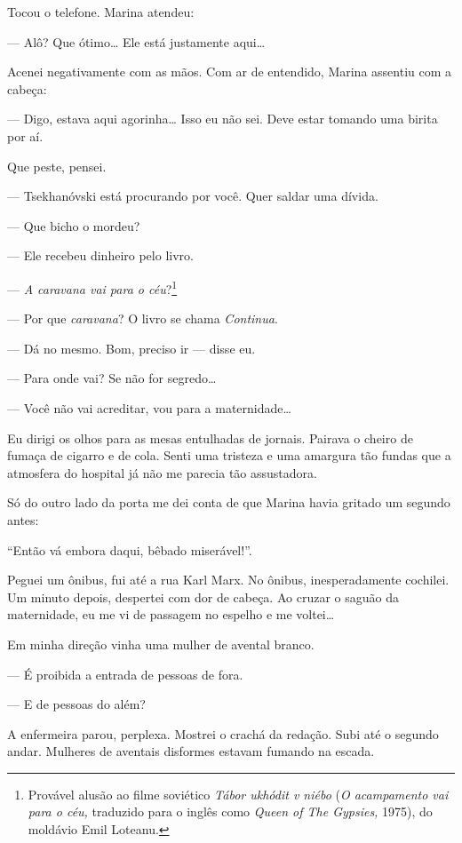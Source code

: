 Tocou o telefone. Marina atendeu:

--- Alô? Que ótimo\ldots{} Ele está justamente aqui\ldots{}

Acenei negativamente com as mãos. Com ar de entendido, Marina assentiu
com a cabeça:

--- Digo, estava aqui agorinha\ldots{} Isso eu não sei. Deve estar tomando
uma birita por aí.

Que peste, pensei.

--- Tsekhanóvski está procurando por você. Quer saldar uma dívida.

--- Que bicho o mordeu?

--- Ele recebeu dinheiro pelo livro.

--- \emph{A caravana vai para o céu}?\footnote{Provável alusão ao filme
  soviético \emph{Tábor ukhódit v niébo} (\emph{O acampamento vai para o
  céu,} traduzido para o inglês como \emph{Queen of The Gypsies,} 1975),
  do moldávio Emil Loteanu.}

--- Por que \emph{caravana}? O livro se chama \emph{Continua}.

--- Dá no mesmo. Bom, preciso ir --- disse eu.

--- Para onde vai? Se não for segredo\ldots{}

--- Você não vai acreditar, vou para a maternidade\ldots{}

Eu dirigi os olhos para as mesas entulhadas de jornais. Pairava o cheiro
de fumaça de cigarro e de cola. Senti uma tristeza e uma amargura tão
fundas que a atmosfera do hospital já não me parecia tão assustadora.

Só do outro lado da porta me dei conta de que Marina havia gritado um
segundo antes:

``Então vá embora daqui, bêbado miserável!''.

\bigskip

Peguei um ônibus, fui até a rua Karl Marx. No ônibus, inesperadamente
cochilei. Um minuto depois, despertei com dor de cabeça. Ao cruzar o
saguão da maternidade, eu me vi de passagem no espelho e me
voltei\ldots{}

Em minha direção vinha uma mulher de avental branco.

--- É proibida a entrada de pessoas de fora.

--- E de pessoas do além?

A enfermeira parou, perplexa. Mostrei o crachá da redação. Subi até o
segundo andar. Mulheres de aventais disformes estavam fumando na escada.


